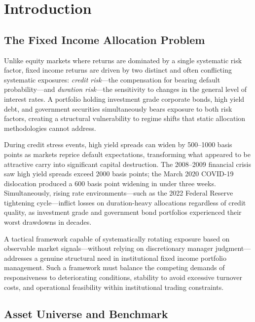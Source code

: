\documentclass[11pt]{article}
\begin{document}
\newpage
\tableofcontents
\newpage

\section{Introduction}

\subsection{The Fixed Income Allocation Problem}

Unlike equity markets where returns are dominated by a single systematic risk factor, fixed income returns are driven by two distinct and often conflicting systematic exposures: \textit{credit risk}---the compensation for bearing default probability---and \textit{duration risk}---the sensitivity to changes in the general level of interest rates. A portfolio holding investment grade corporate bonds, high yield debt, and government securities simultaneously bears exposure to both risk factors, creating a structural vulnerability to regime shifts that static allocation methodologies cannot address.

During credit stress events, high yield spreads can widen by 500--1000 basis points as markets reprice default expectations, transforming what appeared to be attractive carry into significant capital destruction. The 2008--2009 financial crisis saw high yield spreads exceed 2000 basis points; the March 2020 COVID-19 dislocation produced a 600 basis point widening in under three weeks. Simultaneously, rising rate environments---such as the 2022 Federal Reserve tightening cycle---inflict losses on duration-heavy allocations regardless of credit quality, as investment grade and government bond portfolios experienced their worst drawdowns in decades.

A tactical framework capable of systematically rotating exposure based on observable market signals---without relying on discretionary manager judgment---addresses a genuine structural need in institutional fixed income portfolio management. Such a framework must balance the competing demands of responsiveness to deteriorating conditions, stability to avoid excessive turnover costs, and operational feasibility within institutional trading constraints.

\subsection{Asset Universe and Benchmark}
\end{document}
